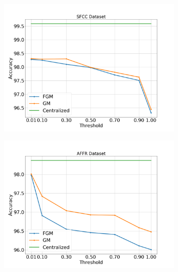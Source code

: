 \begin{figure}[H]
    \centering
    \begin{subfigure}[b]{0.45\textwidth}
        \centering
        \includegraphics[width=\textwidth]{./images/results/sfc-plots/exp_Fig_1_1.png}
        \caption{}
    \end{subfigure}
    \hfill
    \begin{subfigure}[b]{0.45\textwidth}
        \centering
        \includegraphics[width=\textwidth]{./images/results/amazon-plots/exp_Fig_1_1.png}
        \caption{}
    \end{subfigure}
    \begin{subfigure}[b]{0.45\textwidth}
        \centering

\end{subfigure}
\end{figure}
